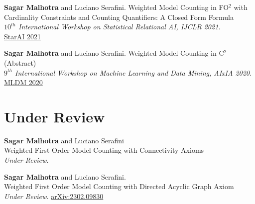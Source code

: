 \documentclass[10pt, a4paper]{article}
\newcommand{\years}[1]{\marginnote{\scriptsize #1}}
\begin{document}
\years{2021}\textbf{Sagar Malhotra} and Luciano Serafini. Weighted Model Counting in FO$^2$ with Cardinality Constraints and Counting Quantifiers: A Closed Form Formula\\ \emph{$10^{th}$ International Workshop on Statistical Relational AI, IJCLR 2021. }\\
\href{https://starai.cs.kuleuven.be/2021/}{ StarAI 2021} 

\years{{2020}}\textbf{Sagar Malhotra} and Luciano Serafini. Weighted Model Counting in C$^2$ (Abstract)\\
\emph{$9^{th}$ International Workshop on Machine Learning and Data Mining, AIxIA 2020}. \\
\href{https://sites.google.com/view/mldm2020-workshop/program?authuser=0}{MLDM 2020} 


\newpage
\section*{Under Review}
\years{2023}\textbf{Sagar Malhotra} and Luciano Serafini\\
Weighted First Order Model Counting with Connectivity Axioms\\
\emph{Under Review.}


\years{2023}\textbf{Sagar Malhotra} and Luciano Serafini.\\
Weighted First Order Model Counting with Directed Acyclic Graph Axiom\\
\emph{Under Review.} \href{https://arxiv.org/abs/2302.09830}{arXiv:2302.09830}\\ 

\end{document}
